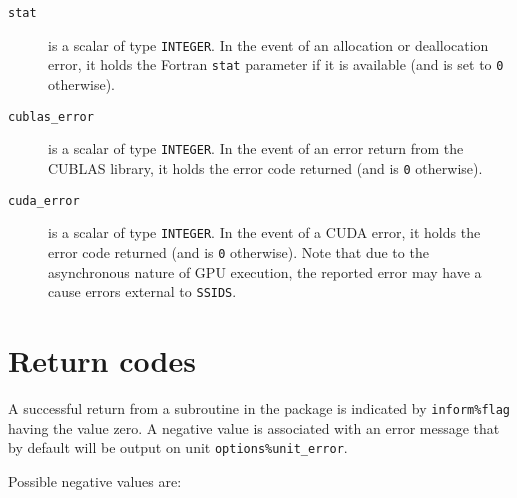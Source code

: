 \begin{description}
\item[\texttt{stat}] is a scalar of type  {\tt INTEGER}.
In the event of an allocation or deallocation error, it
holds the Fortran {\tt stat} parameter if it is available
(and is set to {\tt 0} otherwise).

\item[\texttt{cublas\_error}] is a scalar of type {\tt INTEGER}.
In the event of an error return from the CUBLAS library, it
holds the error code returned (and is {\tt 0} otherwise).

\item[\texttt{cuda\_error}] is a scalar of type {\tt INTEGER}.
In the event of a CUDA error, it holds the error code returned (and is {\tt 0}
otherwise). Note that due to the asynchronous nature of GPU execution, the
reported error may have a cause errors external to {\tt SSIDS}.

\end{description}



\section{Return codes} \label{errors}

A successful return from a subroutine in the package is indicated by
{\tt inform\%flag} having the value zero.
A negative value is associated with an error message that by default will
be output on unit {\tt options\%unit\_error}.

Possible negative values are:

